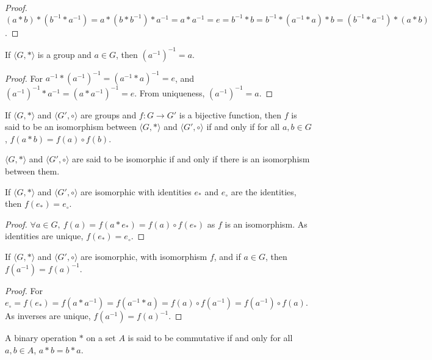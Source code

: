 \documentclass[crop=false,class=book]{standalone}
\begin{document}
\begin{proof}
$(a*b)*(b^{-1}*a^{-1}) = a*(b*b^{-1})*a^{-1} = a*a^{-1} = e=b^{-1}*b=b^{-1}*(a^{-1}*a)*b=(b^{-1}*a^{-1})*(a*b)  $.
\end{proof}
\begin{theorem}
If $\langle G,* \rangle$ is a group and $a\in G$, then $(a^{-1})^{-1} = a$.
\end{theorem}
\begin{proof}
For $a^{-1}*(a^{-1})^{-1} = (a^{-1}* a)^{-1} = e$, and $(a^{-1})^{-1}*a^{-1} = (a*a^{-1})^{-1} = e$. From uniqueness, $(a^{-1})^{-1} = a$.
\end{proof}
\begin{definition}
If $\langle G, * \rangle$ and $\langle G',\circ \rangle$ are groups and $f:G\rightarrow G'$ is a bijective function, then $f$ is said to be an isomorphism between $\langle G, * \rangle$ and $\langle G',\circ \rangle$ if and only if for all $a,b\in G$, $f(a*b) =f(a)\circ f(b)$.
\end{definition}
\begin{definition}
$\langle G, *\rangle$ and $\langle G', \circ \rangle$ are said to be isomorphic if and only if there is an isomorphism between them.
\end{definition}
\begin{theorem}
If $\langle G, * \rangle$ and $\langle G', \circ \rangle$ are isomorphic with identities $e_*$ and $e_{\circ}$ are the identities, then $f(e_*) = e_{\circ}$.
\end{theorem}
\begin{proof}
$\forall a\in G,\ f(a)=f(a* e_*) = f(a)\circ f(e_*)$ as $f$ is an isomorphism. As identities are unique, $f(e_*) = e_{\circ}$.
\end{proof}
\begin{theorem}
If $\langle G, * \rangle$ and $\langle G', \circ \rangle$ are isomorphic, with isomorphism $f$, and if $a\in G$, then $f(a^{-1}) = f(a)^{-1}$.
\end{theorem}
\begin{proof}
For $e_{\circ}=f(e_*) = f(a*a^{-1}) = f(a^{-1}*a) = f(a)\circ f(a^{-1})=f(a^{-1})\circ f(a)$. As inverses are unique, $f(a^{-1})=f(a)^{-1}$.
\end{proof}
\begin{definition}
A binary operation $*$ on a set $A$ is said to be commutative if and only for all $a,b\in A$, $a*b = b*a$.
\end{definition}
\end{document}
